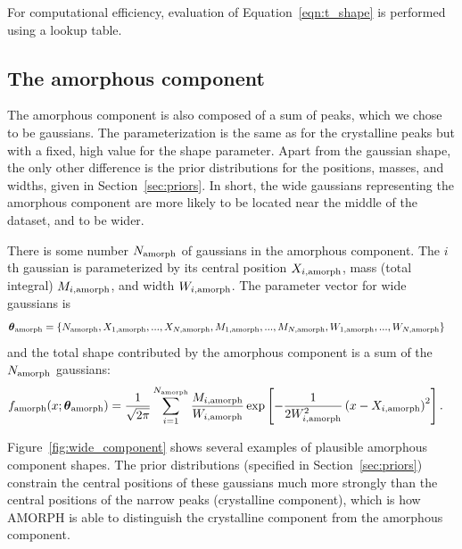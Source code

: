 \documentclass[review]{elsarticle}
\newcommand{\params}{\boldsymbol{\theta}}
\newcommand{\x}{x}
\begin{document}
For computational efficiency, evaluation of Equation~\ref{eqn:t_shape}
is performed using a lookup table.

\subsection{The amorphous component}
The amorphous component is also composed of a sum of peaks, which we chose to be
gaussians. The parameterization is the same as for the crystalline peaks but with a fixed,
high value for the shape parameter.
Apart from the gaussian shape, the only other difference is the prior distributions for the positions, masses, and widths, given in Section~\ref{sec:priors}. In short, the wide gaussians representing the
amorphous component are more likely to be located near the middle of the
dataset, and to be wider.

There is some number $N_{\rm amorph}$ of gaussians in the amorphous component.
The $i$th gaussian is parameterized
by its central position $X_{i, \rm amorph}$,
mass (total integral) $M_{i, \rm amorph}$, and width $W_{i, \rm amorph}$.
The parameter vector for wide gaussians is
\begin{align}
\params_{\rm amorph} &=
  \{N_{\rm amorph}, X_{1, \rm amorph}, ..., X_{N, \rm amorph},
    M_{1, \rm amorph}, ..., M_{N, \rm amorph},
    W_{1, \rm amorph}, ..., W_{N, \rm amorph}\}
\end{align}
and the total shape contributed by the
amorphous component is a sum of the $N_{\rm amorph}$ gaussians:
\begin{align}
f_{\rm amorph}(\x; \params_{\rm amorph}) &=
	\frac{1}{\sqrt{2\pi}}
    \sum_{i=1}^{N_{\rm amorph}} \frac{M_{i, \rm amorph}}{W_{i, \rm amorph}}
 \exp\left[-\frac{1}{2W_{i, \rm amorph}^2}\left(x - X_{i, \rm amorph}\right)^2\right].
\end{align}

Figure~\ref{fig:wide_component} shows several examples of plausible amorphous component shapes. The prior distributions (specified in
Section~\ref{sec:priors})
constrain the central positions of these gaussians much
more strongly than the central positions of the narrow peaks (crystalline component), which is how AMORPH is able to distinguish the crystalline
component from the amorphous component.
\end{document}
